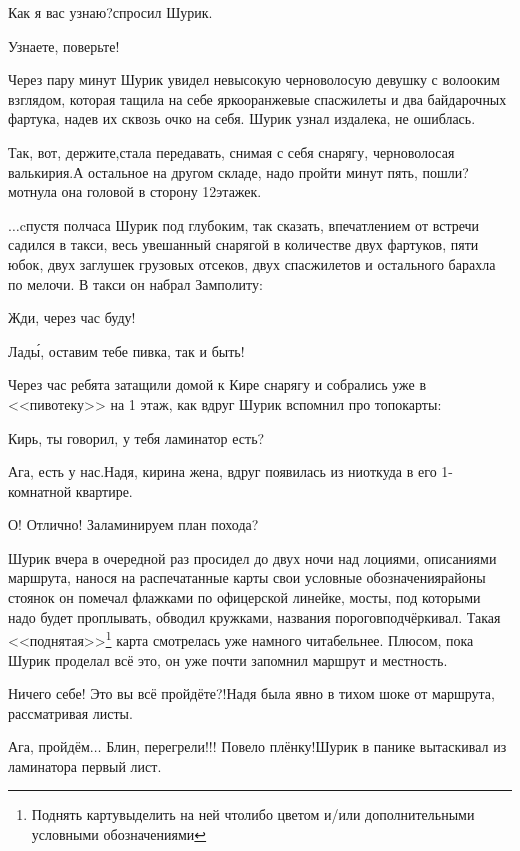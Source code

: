 \diagdash Как я вас узнаю?\mdash спросил Шурик.

\diagdash Узнаете, поверьте!

Через пару минут Шурик увидел невысокую черноволосую девушку с волооким взглядом, которая тащила на себе ярко\sdash оранжевые спасжилеты и два байдарочных фартука, надев их сквозь очко на себя. Шурик узнал издалека, не ошиблась.

\diagdash Так, вот, держите,\mdash стала передавать, снимая с себя снарягу, черноволосая валькирия.\mdash А остальное на другом складе, надо пройти минут пять, пошли?\mdash мотнула она головой в сторону 12\sdash этажек.

$\ldots$cпустя полчаса Шурик под глубоким, так сказать, впечатлением от встречи садился в такси, весь увешанный снарягой в количестве двух фартуков, пяти юбок, двух заглушек грузовых отсеков, двух спасжилетов и остального барахла по мелочи. В такси он набрал Замполиту:

\diagdash Жди, через час буду!

\diagdash Лад\'{ы}, оставим тебе пивка, так и быть!

Через час ребята затащили домой к Кире снарягу и собрались уже в <<пивотеку>> на 1 этаж, как вдруг Шурик вспомнил про топокарты:

\diagdash Кирь, ты говорил, у тебя ламинатор есть?

\diagdash Ага, есть у нас.\mdash Надя, кирина жена, вдруг появилась из ниоткуда в его 1-комнатной квартире.

\diagdash О! Отлично! Заламинируем план похода?

\renewcommand*{\thefootnote}{\fnsymbol{footnote}}
Шурик вчера в очередной раз просидел до двух ночи над лоциями, описаниями маршрута, нанося на распечатанные карты свои условные обозначения\mdash районы стоянок он помечал флажками по офицерской линейке, мосты, под которыми надо будет проплывать, обводил кружками, названия порогов\mdash подчёркивал. Такая <<поднятая>>\footnote[1]{Поднять карту\mdash выделить на ней что\sdash либо цветом и/или дополнительными условными обозначениями} карта смотрелась уже намного читабельнее. Плюсом, пока Шурик проделал всё это, он уже почти запомнил маршрут и местность.

\diagdash Ничего себе! Это вы всё пройдёте?!\mdash Надя была явно в тихом шоке от маршрута, рассматривая листы.

\diagdash Ага, пройдём$\ldots$ Блин, перегрели!!! Повело плёнку!\mdash Шурик в панике вытаскивал из ламинатора первый лист.%

